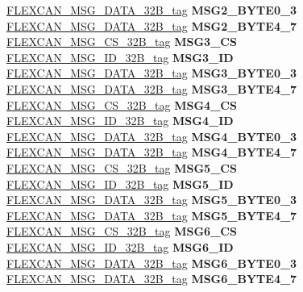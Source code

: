 \begin{DoxyCompactItemize}
\begin{tabbing}
\>\>\mbox{\hyperlink{unionFLEXCAN__MSG__DATA__32B__tag}{FLEXCAN\_MSG\_DATA\_32B\_tag}} {\bfseries MSG2\_BYTE0\_3}\\
\>\>\mbox{\hyperlink{unionFLEXCAN__MSG__DATA__32B__tag}{FLEXCAN\_MSG\_DATA\_32B\_tag}} {\bfseries MSG2\_BYTE4\_7}\\
\>\>\mbox{\hyperlink{unionFLEXCAN__MSG__CS__32B__tag}{FLEXCAN\_MSG\_CS\_32B\_tag}} {\bfseries MSG3\_CS}\\
\>\>\mbox{\hyperlink{unionFLEXCAN__MSG__ID__32B__tag}{FLEXCAN\_MSG\_ID\_32B\_tag}} {\bfseries MSG3\_ID}\\
\>\>\mbox{\hyperlink{unionFLEXCAN__MSG__DATA__32B__tag}{FLEXCAN\_MSG\_DATA\_32B\_tag}} {\bfseries MSG3\_BYTE0\_3}\\
\>\>\mbox{\hyperlink{unionFLEXCAN__MSG__DATA__32B__tag}{FLEXCAN\_MSG\_DATA\_32B\_tag}} {\bfseries MSG3\_BYTE4\_7}\\
\>\>\mbox{\hyperlink{unionFLEXCAN__MSG__CS__32B__tag}{FLEXCAN\_MSG\_CS\_32B\_tag}} {\bfseries MSG4\_CS}\\
\>\>\mbox{\hyperlink{unionFLEXCAN__MSG__ID__32B__tag}{FLEXCAN\_MSG\_ID\_32B\_tag}} {\bfseries MSG4\_ID}\\
\>\>\mbox{\hyperlink{unionFLEXCAN__MSG__DATA__32B__tag}{FLEXCAN\_MSG\_DATA\_32B\_tag}} {\bfseries MSG4\_BYTE0\_3}\\
\>\>\mbox{\hyperlink{unionFLEXCAN__MSG__DATA__32B__tag}{FLEXCAN\_MSG\_DATA\_32B\_tag}} {\bfseries MSG4\_BYTE4\_7}\\
\>\>\mbox{\hyperlink{unionFLEXCAN__MSG__CS__32B__tag}{FLEXCAN\_MSG\_CS\_32B\_tag}} {\bfseries MSG5\_CS}\\
\>\>\mbox{\hyperlink{unionFLEXCAN__MSG__ID__32B__tag}{FLEXCAN\_MSG\_ID\_32B\_tag}} {\bfseries MSG5\_ID}\\
\>\>\mbox{\hyperlink{unionFLEXCAN__MSG__DATA__32B__tag}{FLEXCAN\_MSG\_DATA\_32B\_tag}} {\bfseries MSG5\_BYTE0\_3}\\
\>\>\mbox{\hyperlink{unionFLEXCAN__MSG__DATA__32B__tag}{FLEXCAN\_MSG\_DATA\_32B\_tag}} {\bfseries MSG5\_BYTE4\_7}\\
\>\>\mbox{\hyperlink{unionFLEXCAN__MSG__CS__32B__tag}{FLEXCAN\_MSG\_CS\_32B\_tag}} {\bfseries MSG6\_CS}\\
\>\>\mbox{\hyperlink{unionFLEXCAN__MSG__ID__32B__tag}{FLEXCAN\_MSG\_ID\_32B\_tag}} {\bfseries MSG6\_ID}\\
\>\>\mbox{\hyperlink{unionFLEXCAN__MSG__DATA__32B__tag}{FLEXCAN\_MSG\_DATA\_32B\_tag}} {\bfseries MSG6\_BYTE0\_3}\\
\>\>\mbox{\hyperlink{unionFLEXCAN__MSG__DATA__32B__tag}{FLEXCAN\_MSG\_DATA\_32B\_tag}} {\bfseries MSG6\_BYTE4\_7}\\

\end{tabbing}
\end{DoxyCompactItemize}

